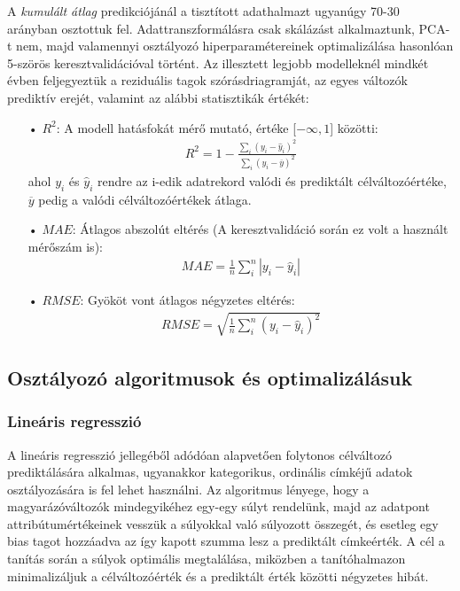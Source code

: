 \documentclass[12pt]{article}
\begin{document}
A \textit{kumulált átlag} predikciójánál a tisztított adathalmazt ugyanúgy 70-30 arányban osztottuk fel. Adattranszformálásra csak skálázást alkalmaztunk, PCA-t nem, majd valamennyi osztályozó hiperparamétereinek optimalizálása hasonlóan 5-szörös keresztvalidációval történt. Az illesztett legjobb modelleknél mindkét évben feljegyeztük a reziduális tagok szórásdriagramját, az egyes változók prediktív erejét, valamint az alábbi statisztikák értékét:
\begin{itemize}
\item[•] $R^2$: A modell hatásfokát mérő mutató, értéke [$-\infty,1$] közötti:
\begin{align*}
R^2 = 1 - \frac{\sum_i (y_i - \hat{y}_i)^2}{\sum_i (y_i - \overline{y})^2}
\end{align*} 
ahol $y_i$ és $\hat{y}_i$ rendre az i-edik adatrekord valódi és prediktált célváltozóértéke, $\overline{y}$ pedig a valódi célváltozóértékek átlaga.
\item[•] $MAE$: Átlagos abszolút eltérés (A keresztvalidáció során ez volt a használt mérőszám is):
\begin{align*}
MAE = \frac{1}{n}\sum_i^n |y_i -\hat{y}_i| 
\end{align*}
\item[•] $RMSE$: Gyököt vont átlagos négyzetes eltérés:
\begin{align*}
RMSE = \sqrt{\frac{1}{n}\sum_i^n (y_i - \hat{y}_i)^2}
\end{align*}
\end{itemize}






\subsection{Osztályozó algoritmusok és optimalizálásuk}

\subsubsection{Lineáris regresszió}

A lineáris regresszió jellegéből adódóan alapvetően folytonos célváltozó prediktálására alkalmas, ugyanakkor kategorikus, ordinális címkéjű adatok osztályozására is fel lehet használni. Az algoritmus lényege, hogy a magyarázóváltozók mindegyikéhez egy-egy súlyt rendelünk, majd az adatpont attribútumértékeinek vesszük a súlyokkal való súlyozott összegét, és esetleg egy bias tagot hozzáadva az így kapott szumma lesz a prediktált címkeérték. A cél a tanítás során a súlyok optimális megtalálása, miközben a tanítóhalmazon minimalizáljuk a célváltozóérték és a prediktált érték közötti négyzetes hibát.
\end{document}
